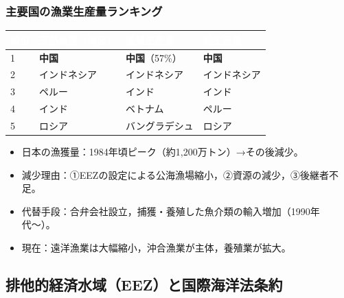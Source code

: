 \documentclass[a4paper,11pt]{article}
\newcommand{\imp}[1]{\textbf{\textcolor{mainred}{#1}}}
\newcommand{\rank}[1]{\textcircled{\scriptsize #1}}
\begin{document}
\vspace{2mm}

\subsubsection{主要国の漁業生産量ランキング}

\begin{center}
\begin{tabular}{C{1cm}C{3.5cm}C{3.5cm}C{3.5cm}}
\toprule
{}\textcolor{white}{\textbf{順位}} & \textcolor{white}{\textbf{天然漁獲（海面）}} & \textcolor{white}{\textbf{養殖生産量}} & \textcolor{white}{\textbf{総生産量}} \\
\midrule
\rank{1} & \imp{中国} & \imp{中国}（57\%） & \imp{中国} \\
\rank{2} & インドネシア & インドネシア & インドネシア \\
\rank{3} & ペルー & インド & インド \\
\rank{4} & インド & ベトナム & ペルー \\
\rank{5} & ロシア & バングラデシュ & ロシア \\
\bottomrule
\end{tabular}
\end{center}

\begin{tcolorbox}[notebox, title={日本の漁業の変化}]
\begin{itemize}[leftmargin=1em]
  \item 日本の漁獲量：1984年頃ピーク（約1,200万トン）→その後減少。
  \item 減少理由：①EEZの設定による公海漁場縮小，②資源の減少，③後継者不足。
  \item 代替手段：合弁会社設立，捕獲・養殖した魚介類の輸入増加（1990年代〜）。
  \item 現在：遠洋漁業は大幅縮小，沖合漁業が主体，養殖業が拡大。
\end{itemize}
\end{tcolorbox}

\vspace{2mm}

\subsection{排他的経済水域（EEZ）と国際海洋法条約}
\end{document}
